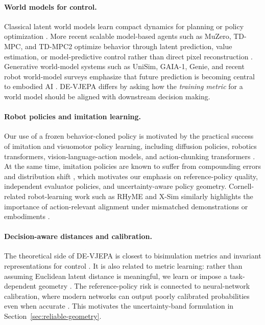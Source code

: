 \documentclass[10pt,twocolumn]{article}
\theoremstyle{tightstyle}
\begin{document}
\paragraph{World models for control.}
Classical latent world models learn compact dynamics for planning or policy
optimization \citep{ha2018worldmodels,hafner2019planet,hafner2020dreamer,
hafner2021dreamerv2,hafner2023dreamerv3}.
More recent scalable model-based agents such as MuZero, TD-MPC, and TD-MPC2
optimize behavior through latent prediction, value estimation, or model-predictive
control rather than direct pixel reconstruction
\citep{schrittwieser2020muzero,hansen2022tdmpc,hansen2024tdmpc2}.
Generative world-model systems such as UniSim, GAIA-1, Genie, and recent robot
world-model surveys emphasize that future prediction is becoming central to
embodied AI \citep{yang2023unisim,hu2023gaia,bruce2024genie,hou2026survey}.
DE-VJEPA differs by asking how the \emph{training metric} for a world model should
be aligned with downstream decision making.

\paragraph{Robot policies and imitation learning.}
Our use of a frozen behavior-cloned policy is motivated by the practical success
of imitation and visuomotor policy learning, including diffusion policies,
robotics transformers, vision-language-action models, and action-chunking
transformers \citep{ross2011dagger,chi2023diffusionpolicy,brohan2022rt1,
zitkovich2023rt2,zhao2023act}.
At the same time, imitation policies are known to suffer from compounding errors
and distribution shift \citep{ross2011dagger}, which motivates our emphasis on
reference-policy quality, independent evaluator policies, and uncertainty-aware
policy geometry. Cornell-related robot-learning work such as RHyME and X-Sim
similarly highlights the importance of action-relevant alignment under mismatched
demonstrations or embodiments \citep{kedia2024rhyme,dan2025xsim}.

\paragraph{Decision-aware distances and calibration.}
The theoretical side of DE-VJEPA is closest to bisimulation metrics and invariant
representations for control \citep{ferns2004metrics,ferns2011continuous,
zhang2020learning}. It is also related to metric learning: rather than assuming
Euclidean latent distance is meaningful, we learn or impose a task-dependent
geometry \citep{weinberger2009lmnn}. The reference-policy risk is connected to
neural-network calibration, where modern networks can output poorly calibrated
probabilities even when accurate \citep{guo2017calibration}. This motivates the
uncertainty-band formulation in Section~\ref{sec:reliable-geometry}.
\end{document}
